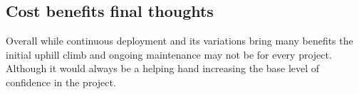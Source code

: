 \subsection{Cost benefits final thoughts}

Overall while continuous deployment and its variations bring many benefits the initial uphill climb and ongoing maintenance may not be for every project. Although it would always be a helping hand increasing the base level of confidence in the project.
